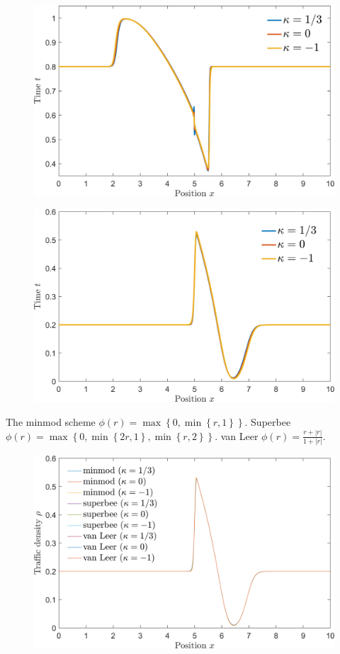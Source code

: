 \documentclass[11pt]{article}
\begin{document}
\begin{figure}[h!]
  \centering
  \includegraphics[width=\textwidth]{2a_heavy.png}
  \caption{}
  \label{fig:2a_heavy}
\end{figure}

\begin{figure}[h!]
  \centering
  \includegraphics[width=\textwidth]{2a_light.png}
  \caption{}
  \label{fig:2a_light}
\end{figure}


The minmod scheme $\phi(r) = \max\left\{ 0, \min\left\{r,1\right\} \right\}$. 
Superbee $\phi(r) = \max \left\{ 0, \min\left\{2r,1\right\}, \min\left\{r,2\right\} \right\} $.
van Leer $\displaystyle \phi(r) = \frac{r + |r|}{1 + |r|}$.

\begin{figure}[h!]
  \centering
  \includegraphics[width=\textwidth]{2b_all.png}
  \caption{}
  \label{fig:2b_all}
\end{figure}
\end{document}
